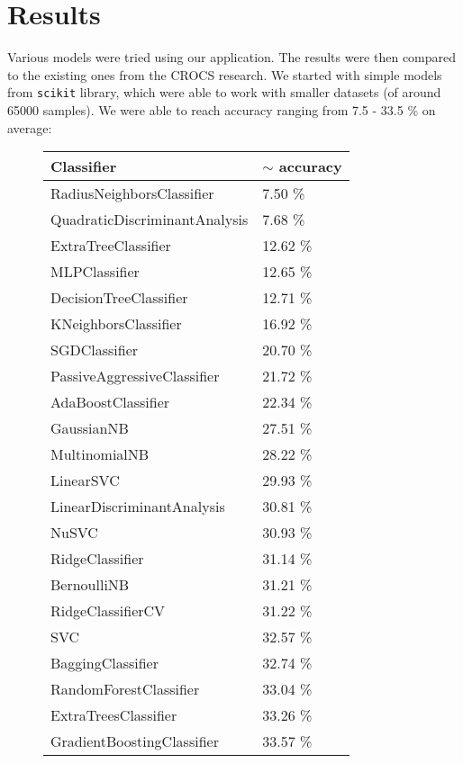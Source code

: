 \chapter{Results}

Various models were tried using our application. The results were then compared to the existing ones from the CROCS research. We started with simple models from \texttt{scikit} library, which were able to work with smaller datasets (of around 65000 samples). We were able to reach accuracy ranging from 7.5 - 33.5 \% on average:

\begin{figure}[H]

\centering

\begin{tabular}{|l|l|}
\hline 
Classifier & $\sim$ accuracy \\
\hline 
RadiusNeighborsClassifier & 7.50 \% \\
QuadraticDiscriminantAnalysis & 7.68 \% \\
ExtraTreeClassifier & 12.62 \% \\
MLPClassifier & 12.65 \% \\
DecisionTreeClassifier & 12.71 \% \\
KNeighborsClassifier & 16.92 \% \\
SGDClassifier & 20.70 \% \\
PassiveAggressiveClassifier & 21.72 \% \\
AdaBoostClassifier & 22.34 \% \\
GaussianNB & 27.51 \% \\
MultinomialNB & 28.22 \% \\
LinearSVC & 29.93 \% \\
LinearDiscriminantAnalysis & 30.81 \% \\
NuSVC & 30.93 \% \\
RidgeClassifier & 31.14 \% \\
BernoulliNB & 31.21 \% \\
RidgeClassifierCV & 31.22 \% \\
SVC & 32.57 \% \\
BaggingClassifier & 32.74 \% \\
RandomForestClassifier & 33.04 \% \\
ExtraTreesClassifier & 33.26 \% \\
GradientBoostingClassifier & 33.57 \% \\ 
\hline
\end{tabular}



\end{figure}


